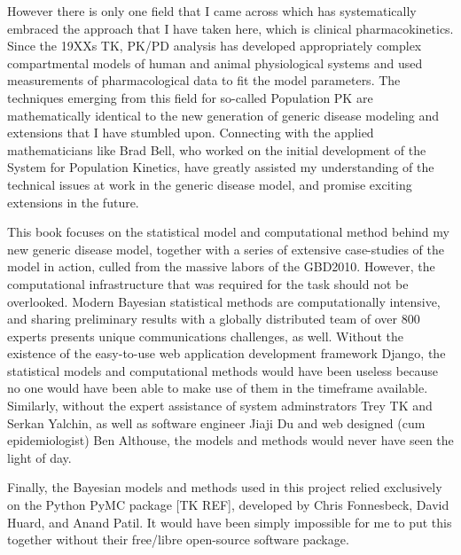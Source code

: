 However there is only one field that I came across which has
systematically embraced the approach that I have taken here, which is
clinical pharmacokinetics. Since the 19XXs TK, PK/PD analysis has
developed appropriately complex compartmental models of human and
animal physiological systems and used measurements of pharmacological
data to fit the model parameters. The techniques emerging from this
field for so-called Population PK are mathematically identical to the
new generation of generic disease modeling and extensions that I have
stumbled upon. Connecting with the applied mathematicians like Brad
Bell, who worked on the initial development of the System for
Population Kinetics, have greatly assisted my understanding of the
technical issues at work in the generic disease model, and promise
exciting extensions in the future.

This book focuses on the statistical model and computational method
behind my new generic disease model, together with a series of
extensive case-studies of the model in action, culled from the massive
labors of the GBD2010. However, the computational infrastructure that
was required for the task should not be overlooked. Modern Bayesian
statistical methods are computationally intensive, and sharing
preliminary results with a globally distributed team of over 800
experts presents unique communications challenges, as well. Without
the existence of the easy-to-use web application development framework
Django, the statistical models and computational methods would have
been useless because no one would have been able to make use of them
in the timeframe available.  Similarly, without the expert assistance
of system adminstrators Trey TK and Serkan Yalchin, as well as
software engineer Jiaji Du and web designed (cum epidemiologist) Ben
Althouse, the models and methods would never have seen the light of
day.

Finally, the Bayesian models and methods used in this project relied
exclusively on the Python PyMC package [TK REF], developed by Chris
Fonnesbeck, David Huard, and Anand Patil. It would have been simply
impossible for me to put this together without their free/libre
open-source software package.
